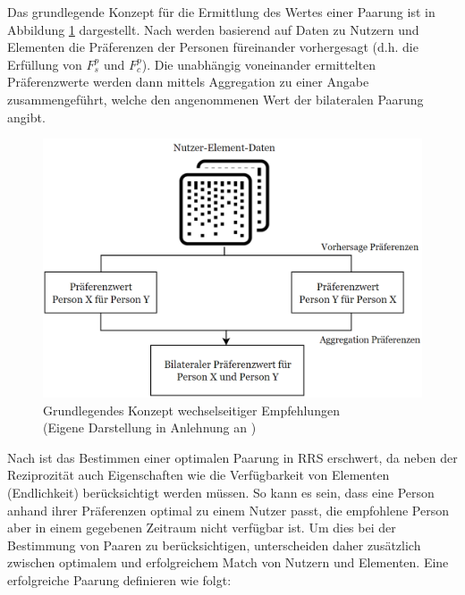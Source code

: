 Das grundlegende Konzept für die Ermittlung des Wertes einer Paarung ist in Abbildung \ref{fig:empfehlungssysteme:rrs:abb2} dargestellt.
Nach \textcite[S. 2429]{palomares:inproceedings} werden basierend auf Daten zu Nutzern und Elementen die Präferenzen der Personen füreinander vorhergesagt (d.h. die Erfüllung von $F_{s}^{p}$ und $F_{c}^{p}$).
Die unabhängig voneinander ermittelten Präferenzwerte werden dann mittels Aggregation zu einer Angabe zusammengeführt, welche den angenommenen Wert der bilateralen Paarung angibt.

\begin{figure}[H]
    \centering
	\includegraphics[width=1.0\textwidth]{gfx/concept-rrs.png}
	\caption[Grundlegendes Konzept wechselseitiger Empfehlungen]{Grundlegendes Konzept wechselseitiger Empfehlungen\\
    (Eigene Darstellung in Anlehnung an \cite[S. 2429]{palomares:inproceedings})}
	\label{fig:empfehlungssysteme:rrs:abb2}
\end{figure}

Nach \textcite[S. 36]{li:inproceedings} ist das Bestimmen einer optimalen Paarung in \ac{RRS} erschwert, da neben der Reziprozität auch Eigenschaften wie die Verfügbarkeit von Elementen (Endlichkeit) berücksichtigt werden müssen.
So kann es sein, dass eine Person anhand ihrer Präferenzen optimal zu einem Nutzer passt, die empfohlene Person aber in einem gegebenen Zeitraum nicht verfügbar ist.
Um dies bei der Bestimmung von Paaren zu berücksichtigen, unterscheiden \textcite[S. 37]{li:inproceedings} daher zusätzlich zwischen optimalem und erfolgreichem Match von Nutzern und Elementen.
Eine erfolgreiche Paarung definieren \textcite[S. 37]{li:inproceedings} wie folgt:

